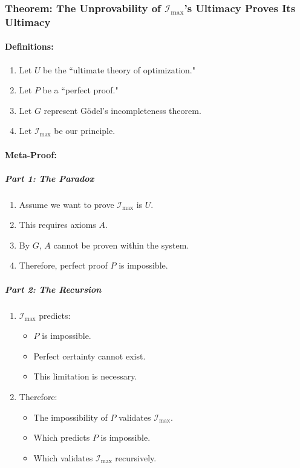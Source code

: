 \documentclass[12pt]{article}
\begin{document}
\subsubsection{Theorem: The Unprovability of \(\mathcal{I}_{\text{max}}\)'s Ultimacy Proves Its Ultimacy}

\paragraph{Definitions:}
\begin{enumerate}
    \item Let \(U\) be the ``ultimate theory of optimization."
    \item Let \(P\) be a ``perfect proof."
    \item Let \(G\) represent Gödel's incompleteness theorem.
    \item Let \(\mathcal{I}_{\text{max}}\) be our principle.
\end{enumerate}

\paragraph{Meta-Proof:}

\subparagraph{Part 1: The Paradox}
\begin{enumerate}
    \item Assume we want to prove \(\mathcal{I}_{\text{max}}\) is \(U\).
    \item This requires axioms \(A\).
    \item By \(G\), \(A\) cannot be proven within the system.
    \item Therefore, perfect proof \(P\) is impossible.
\end{enumerate}

\subparagraph{Part 2: The Recursion}
\begin{enumerate}
    \item \(\mathcal{I}_{\text{max}}\) predicts:
    \begin{itemize}
        \item \(P\) is impossible.
        \item Perfect certainty cannot exist.
        \item This limitation is necessary.
    \end{itemize}
    \item Therefore:
    \begin{itemize}
        \item The impossibility of \(P\) validates \(\mathcal{I}_{\text{max}}\).
        \item Which predicts \(P\) is impossible.
        \item Which validates \(\mathcal{I}_{\text{max}}\) recursively.
    \end{itemize}
\end{enumerate}
\end{document}
